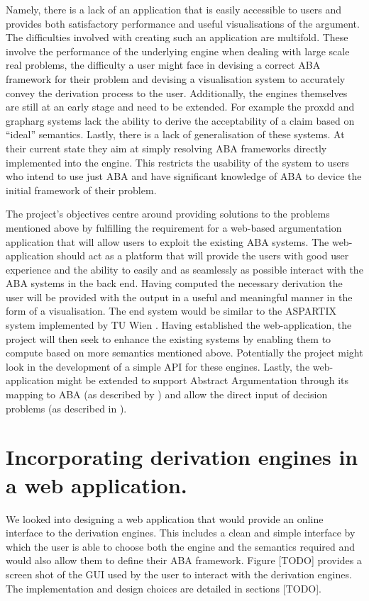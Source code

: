 Namely, there is a lack of an application that is easily accessible to users and provides both satisfactory performance and useful visualisations of the argument. The difficulties involved with creating such an application are multifold.  These involve the performance of the underlying engine when dealing with large scale real problems, the difficulty a user might face in devising a correct ABA framework for their problem and devising a visualisation system to accurately convey the derivation process to the user. Additionally, the engines themselves are still at an early stage and need to be extended. For example the proxdd and grapharg systems lack the ability to derive the acceptability of a claim based on ``ideal'' semantics. Lastly, there is a lack of generalisation of these systems. At their current state they aim at simply resolving ABA frameworks directly implemented into the engine. This restricts the usability of the system to users who intend to use just ABA and have significant knowledge of ABA to device the initial framework of their problem.

The project's objectives centre around providing solutions to the problems mentioned above by fulfilling the requirement for a web-based argumentation application that will allow users to exploit the existing ABA systems. The web-application should act as a platform that will provide the users with good user experience and the ability to easily and as seamlessly as possible interact with the ABA systems in the back end. Having computed the necessary derivation the user will be provided with the output in a useful and meaningful manner in the form of a visualisation. The end system would be similar to the ASPARTIX system implemented by TU Wien \cite{aspartix}. Having established the web-application, the project will then seek to enhance the existing systems by enabling them to compute based on more semantics mentioned above. Potentially the project might look in the development of a simple API for these engines. Lastly, the web-application might be extended to support Abstract Argumentation through its mapping to ABA (as described by \cite{AAmapping}) and allow the direct input of decision problems (as described in \cite{decision}). 

\section{Incorporating derivation engines in a web application.}

We looked into designing a web application that would provide an online interface to the derivation engines. This includes a clean and simple interface by which the user is able to choose both the engine and the semantics required and would also allow them to define their ABA framework. Figure [TODO] provides a screen shot of the GUI used by the user to interact with the derivation engines. The implementation and design choices are detailed in sections [TODO].

